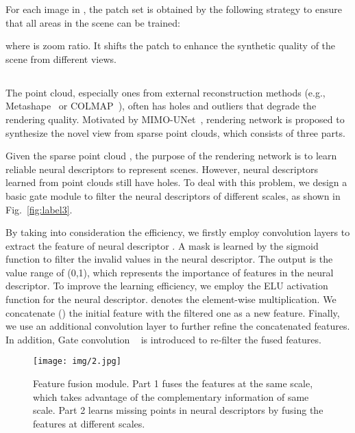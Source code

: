 \documentclass[sigconf]{acmart}
\begin{document}
For each image  in , the patch set  is obtained by the following strategy to ensure that all areas in the scene can be trained:

where  is zoom ratio. It shifts the patch  to enhance the synthetic quality of the scene from different views.





\subsection{ }
The point cloud, especially ones from external reconstruction methods (e.g., Metashape~\cite{Metashape} or COLMAP~\cite{schonberger2016structure}), often has holes and outliers that degrade the rendering quality. Motivated by MIMO-UNet~\cite{cho2021rethinking}, rendering network  is proposed to synthesize the novel view from sparse point clouds, which consists of three parts.
  
Given the sparse point cloud , the purpose of the rendering network is to learn reliable neural descriptors to represent scenes. However, neural descriptors learned from point clouds still have holes. To deal with this problem, we design a basic gate module to filter the neural descriptors of different scales, as shown in Fig.~\ref{fig:label3}.
 
By taking into consideration the efficiency, we firstly employ  convolution layers  to extract the feature of neural descriptor . A mask is learned by the sigmoid function to filter the invalid values in the neural descriptor. The output is the value range of (0,1), which represents the importance of features in the neural descriptor. To improve the learning efficiency, we employ the ELU activation function for the neural descriptor.  denotes the element-wise multiplication. We concatenate () the initial feature with the filtered one as a new feature. Finally, we use an additional  convolution layer to further refine the concatenated features. In addition, Gate convolution ~\cite{yu2019free} is introduced to re-filter the fused features.
 


 








\begin{figure}[h]
  \centering
  \texttt{[image: img/2.jpg]}
  \caption{Feature fusion module. Part 1 fuses the features at the same scale, which takes advantage of the complementary information of same scale. Part 2 learns missing points in neural descriptors by fusing the features at different scales.}
    \label{fig:label4}
\end{figure}
\end{document}
